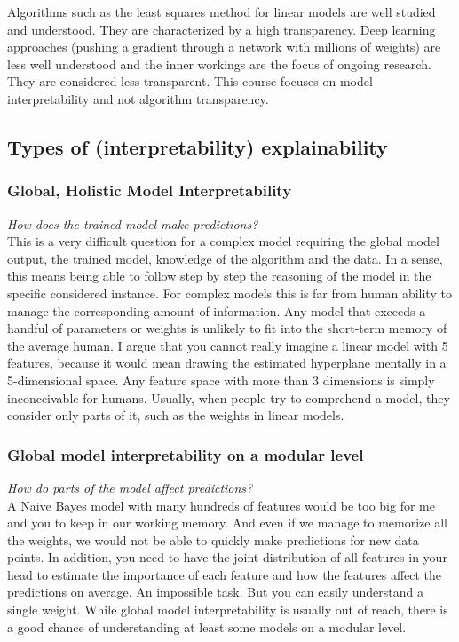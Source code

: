 Algorithms such as the least squares method for linear models are well studied and understood. 
They are characterized by a high transparency. Deep learning approaches (pushing a gradient 
through a network with millions of weights) are less well understood and the inner workings 
are the focus of ongoing research. They are considered less transparent.
This course focuses on model interpretability and not algorithm transparency.

\subsection{Types of (interpretability) explainability}
\subsubsection{Global, Holistic Model Interpretability}
\textit{How does the trained model make predictions?}\\

This is a very difficult question for a complex model requiring the global model output, the trained
model, knowledge of the algorithm and the data.
In a sense, this means being able to follow step by step the reasoning of the model in the specific
considered instance. For complex models this is far from human ability to manage the corresponding
amount of information. Any model that exceeds a handful of parameters or weights is unlikely to fit 
into the short-term memory of the average human. 
I argue that you cannot really imagine a linear model with 5 features, because it would mean drawing 
the estimated hyperplane mentally in a 5-dimensional space. Any feature space with more than 3 dimensions 
is simply inconceivable for humans. Usually, when people try to comprehend a model, they consider only 
parts of it, such as the weights in linear models.

\subsubsection{Global model interpretability on a modular level}
\textit{How do parts of the model affect predictions?}\\

A Naive Bayes model with many hundreds of features would be too big for me and you to keep in our working memory. 
And even if we manage to memorize all the weights, we would not be able to quickly make predictions for new data points. 
In addition, you need to have the joint distribution of all features in your head to estimate the importance of 
each feature and how the features affect the predictions on average. An impossible task. But you can easily understand 
a single weight. While global model interpretability is usually out of reach, there is a good chance of understanding 
at least some models on a modular level.

